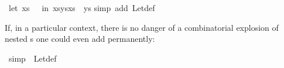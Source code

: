 \begin{isabelle}%
\ {\isachardoublequote}{\isacharparenleft}let\ xs\ {\isacharequal}\ {\isacharbrackleft}{\isacharbrackright}\ in\ xs{\isacharat}ys{\isacharat}xs{\isacharparenright}\ {\isacharequal}\ ys{\isachardoublequote}\isanewline
{}simp\ add{\isacharcolon}\ Let{\isacharunderscore}def{\isacharparenright}%
\begin{isamarkuptext}%
If, in a particular context, there is no danger of a combinatorial explosion
of nested s one could even add  permanently:%
\end{isamarkuptext}%
\ {\isacharbrackleft}simp{\isacharbrackright}\ {\isacharequal}\ Let{\isacharunderscore}def\end{isabelle}%
